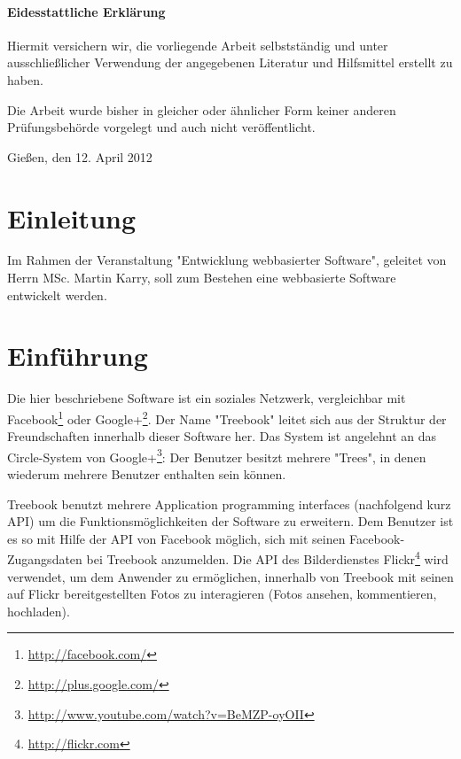 \documentclass[10pt,a4paper]{book}
\begin{document}
\begin{titlepage}
\subsubsection{Eidesstattliche Erklärung}
Hiermit versichern wir, die vorliegende Arbeit selbstständig und unter ausschließlicher Verwendung der angegebenen Literatur und Hilfsmittel erstellt zu haben.

Die Arbeit wurde bisher in gleicher oder ähnlicher Form keiner anderen Prüfungsbehörde vorgelegt und auch nicht veröffentlicht.

\bigskip
\bigskip
\bigskip
\bigskip
\bigskip
Gießen, den 12. April 2012
\end{titlepage}
\setcounter{page}{1}

\tableofcontents
\renewcommand{\chaptername}{}
\renewcommand{\thechapter}{}
\renewcommand{\thesection}{\arabic{section}}
\renewcommand{\thefigure}{\arabic{figure}}

\chapter{Einleitung}
Im Rahmen der Veranstaltung "Entwicklung webbasierter Software", geleitet von Herrn MSc. Martin Karry, soll zum Bestehen eine webbasierte Software entwickelt werden.
\chapter{Einführung}
Die hier beschriebene Software ist ein soziales Netzwerk, vergleichbar mit Facebook\footnote{\href{http://facebook.com/}{http://facebook.com/}
} oder Google+\footnote{\href{http://plus.google.com/}{http://plus.google.com/}}. Der Name "Treebook" leitet sich aus der Struktur der 
Freundschaften innerhalb dieser Software her. Das System ist angelehnt an das Circle-System von Google+\footnote{\href{http://www.youtube.
com/watch?v=BeMZP-oyOII}{http://www.youtube.com/watch?v=BeMZP-oyOII}}: Der Benutzer besitzt mehrere "Trees", in denen wiederum 
mehrere Benutzer enthalten sein können.

Treebook benutzt mehrere Application programming interfaces (nachfolgend kurz API) um die Funktionsmöglichkeiten der Software zu erweitern. 
Dem Benutzer ist es so mit Hilfe der API von Facebook möglich, sich mit seinen Facebook-Zugangsdaten bei Treebook anzumelden. Die API des 
Bilderdienstes Flickr\footnote{\href{http://flickr.com}{http://flickr.com}} wird verwendet, um dem Anwender zu ermöglichen, innerhalb von 
Treebook mit seinen auf Flickr bereitgestellten Fotos zu interagieren (Fotos ansehen, kommentieren, hochladen).
\end{document}
